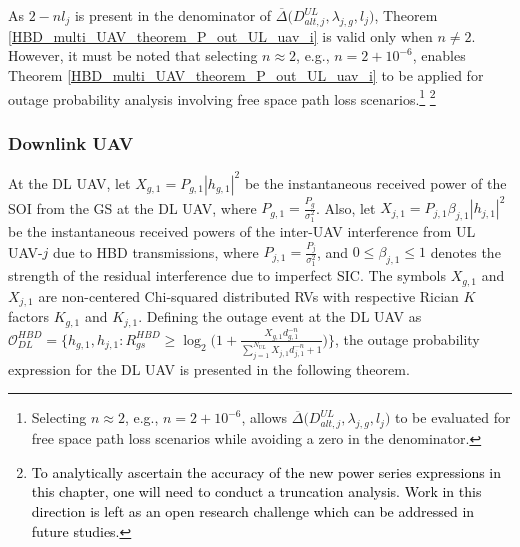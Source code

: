 As $2-nl_j$ is present in the denominator of $\overline{\Delta}\big(D_{alt,j}^{UL},\lambda_{j,g},l_j\big)$, Theorem \ref{HBD_multi_UAV_theorem_P_out_UL_uav_i} is valid only when $n \neq 2$. However, it must be noted that selecting $n \approx 2$, e.g., $n = 2 + 10^{-6}$, enables Theorem \ref{HBD_multi_UAV_theorem_P_out_UL_uav_i} to be applied for outage probability analysis involving free space path loss scenarios.\footnote{Selecting $n \approx 2$, e.g., $n = 2 + 10^{-6}$, allows $\overline{\Delta}\big(D_{alt,j}^{UL},\lambda_{j,g},l_j\big)$ to be evaluated for free space path loss scenarios while avoiding a zero in the denominator.} \textcolor{black}{\footnote{\textcolor{black}{To analytically ascertain the accuracy of the new power series expressions in this chapter, one will need to conduct a truncation analysis. Work in this direction is left as an open research challenge which can be addressed in future studies.}}}

\subsubsection{Downlink UAV}

At the DL UAV, let $X_{g,1}=P_{g,1}|h_{g,1}|^2$ be the instantaneous received power of the SOI from the GS at the DL UAV, where $P_{g,1}=\frac{P_g}{\sigma_1^2}$. Also, let $X_{j,1}=P_{j,1}\beta_{j,1}|h_{j,1}|^2$ be the instantaneous received powers of the inter-UAV interference from UL UAV-$j$ due to HBD transmissions, where $P_{j,1}=\frac{P_j}{\sigma_1^2}$, and $0 \leq \beta_{j,1} \leq 1$ denotes the strength of the residual interference due to imperfect SIC. The symbols $X_{g,1}$ and $X_{j,1}$ are non-centered Chi-squared distributed RVs with respective Rician $K$ factors $K_{g,1}$ and $K_{j,1}$. Defining the outage event at the DL UAV as $\mathcal{O}_{DL}^{HBD} = \Big\{ h_{g,1}, h_{j,1} : R_{gs}^{HBD} \geq \log_{2}\Big(1 + \frac{X_{g,1}d_{g,1}^{-n}}{\sum_{j=1}^{N_{UL}}X_{j,1}d_{j,1}^{-n} + 1}\Big)\Big\}$, the outage probability expression for the DL UAV is presented in the following theorem.

